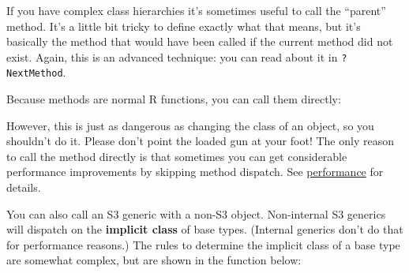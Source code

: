 If you have complex class hierarchies it's sometimes useful to call the
``parent'' method. It's a little bit tricky to define exactly what that
means, but it's basically the method that would have been called if the
current method did not exist. Again, this is an advanced technique: you
can read about it in \texttt{?NextMethod}. 

Because methods are normal R functions, you can call them directly:

\begin{Shaded}
\begin{Highlighting}[]
\StringTok{ }\NormalTok{(}\NormalTok{(), } \NormalTok{)}
\end{Highlighting}
\end{Shaded}

However, this is just as dangerous as changing the class of an object,
so you shouldn't do it. Please don't point the loaded gun at your foot!
The only reason to call the method directly is that sometimes you can
get considerable performance improvements by skipping method dispatch.
See \hyperref[be-lazy]{performance} for details.

You can also call an S3 generic with a non-S3 object. Non-internal S3
generics will dispatch on the \textbf{implicit class} of base types.
(Internal generics don't do that for performance reasons.) The rules to
determine the implicit class of a base type are somewhat complex, but
are shown in the function below: 

\begin{Shaded}
\begin{Highlighting}[]
\StringTok{ }
    \NormalTok{(}\NormalTok{, } \NormalTok{)}
  \NormalTok{\}}

  \NormalTok{(}
    \NormalTok{,}
    \StringTok{ }\NormalTok{!}\NormalTok{,}
    \NormalTok{,}
    \NormalTok{,}
  \NormalTok{)}
\NormalTok{\}}
\NormalTok{(}\NormalTok{(}\NormalTok{:}\NormalTok{))}
\NormalTok{(}\NormalTok{(}\NormalTok{))}
\end{Highlighting}
\end{Shaded}

